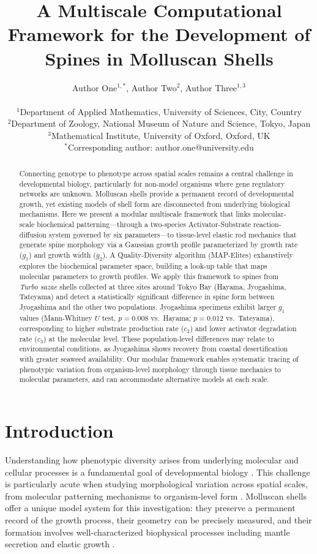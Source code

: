 \documentclass[11pt]{article}
\title{A Multiscale Computational Framework for the Development of Spines in Molluscan Shells}
\author{
Author One$^{1,*}$, Author Two$^{2}$, Author Three$^{1,3}$ \\
\\
$^{1}$Department of Applied Mathematics, University of Sciences, City, Country \\
$^{2}$Department of Zoology, National Museum of Nature and Science, Tokyo, Japan \\
$^{3}$Mathematical Institute, University of Oxford, Oxford, UK \\
$^{*}$Corresponding author: author.one@university.edu
}
\date{}
\begin{document}
\maketitle

\begin{abstract}
Connecting genotype to phenotype across spatial scales remains a central challenge in developmental biology, particularly for non-model organisms where gene regulatory networks are unknown. Molluscan shells provide a permanent record of developmental growth, yet existing models of shell form are disconnected from underlying biological mechanisms. Here we present a modular multiscale framework that links molecular-scale biochemical patterning---through a two-species Activator-Substrate reaction-diffusion system governed by six parameters---to tissue-level elastic rod mechanics that generate spine morphology via a Gaussian growth profile parameterized by growth rate ($g_1$) and growth width ($g_2$). A Quality-Diversity algorithm (MAP-Elites) exhaustively explores the biochemical parameter space, building a look-up table that maps molecular parameters to growth profiles. We apply this framework to spines from \textit{Turbo sazae} shells collected at three sites around Tokyo Bay (Hayama, Jyogashima, Tateyama) and detect a statistically significant difference in spine form between Jyogashima and the other two populations. Jyogashima specimens exhibit larger $g_1$ values (Mann-Whitney $U$ test, $p = 0.008$ vs.\ Hayama; $p = 0.012$ vs.\ Tateyama), corresponding to higher substrate production rate ($c_2$) and lower activator degradation rate ($c_3$) at the molecular level. These population-level differences may relate to environmental conditions, as Jyogashima shows recovery from coastal desertification with greater seaweed availability. Our modular framework enables systematic tracing of phenotypic variation from organism-level morphology through tissue mechanics to molecular parameters, and can accommodate alternative models at each scale.
\end{abstract}

\section{Introduction}

Understanding how phenotypic diversity arises from underlying molecular and cellular processes is a fundamental goal of developmental biology \citep{pigliucci2010, erwin2009}. This challenge is particularly acute when studying morphological variation across spatial scales, from molecular patterning mechanisms to organism-level form \citep{goriely2017, moulton2020}. Molluscan shells offer a unique model system for this investigation: they preserve a permanent record of the growth process, their geometry can be precisely measured, and their formation involves well-characterized biophysical processes including mantle secretion and elastic growth \citep{chirat2013, raup1966}.
\end{document}

